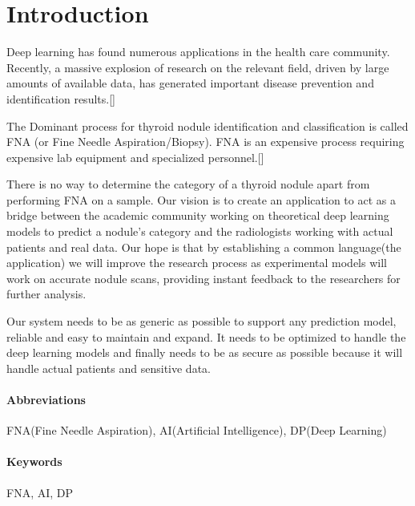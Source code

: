 \chapter{Introduction}
\label{1}

Deep learning has found numerous applications in the health care community. Recently, a massive explosion of research on the relevant field, 
driven by large amounts of available data, has generated important disease prevention and identification results.[\cite{ai-applications}] \par

The Dominant process for thyroid nodule identification and classification is called FNA (or Fine Needle Aspiration/Biopsy). 
FNA is an expensive process requiring expensive lab equipment and specialized personnel.[\cite{fna-proccess}]\par

There is no way to determine the category of a thyroid nodule apart from performing FNA on a sample. Our vision is to create an application to act as a bridge between the academic community working on theoretical deep learning models to predict a
nodule's category and the radiologists working with actual patients and real data. Our hope is that by establishing a common language(the application) 
we will improve the research process as experimental models will work on accurate nodule scans, providing instant feedback to the researchers for further analysis.\par

Our system needs to be as generic as possible to support any prediction model, reliable and easy to maintain and expand. 
It needs to be optimized to handle the deep learning models and finally needs to be as secure as possible because it will handle actual patients and sensitive data.\par

\subsubsection{Abbreviations}FNA(Fine Needle Aspiration), AI(Artificial Intelligence), DP(Deep Learning)
\subsubsection{Keywords}FNA, AI, DP


